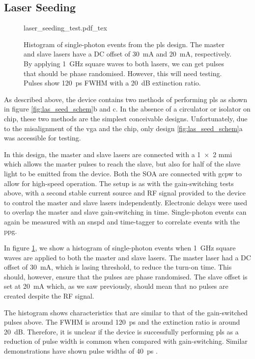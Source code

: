 \subsection{Laser Seeding}

\begin{figure}[tp]
	\centering	
	\def\svgwidth{0.9\textwidth} 
	{laser_seeding_test.pdf_tex}
	\caption[Integrated laser seeding test histogram]{Histogram of single-photon events from the \acs{pls} design. The master and slave lasers have a DC offset of \SI{30}{\mA} and \SI{20}{\mA}, respectively. By applying \SI{1}{GHz} square waves to both lasers, we can get pulses that should be phase randomised. However,  this will need testing. Pulses show \SI{120}{ps} \acs{FWHM} with a \SI{20}{dB} extinction ratio.}
	\label{fig:las_seed_test}
\end{figure}

As described above, the device contains two methods of performing \ac{pls} as shown in figure \ref{fig:las_seed_schem}b and c. In the absence of a circulator or isolator on chip, these two methods are the simplest conceivable designs. Unfortunately, due to the misalignment of the \ac{vga} and the chip, only design \ref{fig:las_seed_schem}a was accessible for testing. 

In this design, the master and slave lasers are connected with a \num{1x2} \ac{mmi} which allows the master pulses to reach the slave, but also for half of the slave light to be emitted from the device. Both the \ac{SOA} are connected with \ac{gcpw} to allow for high-speed operation. The setup is as with the gain-switching tests above, with a second stable current source and RF signal provided to the device to control the master and slave lasers independently. Electronic delays were used to overlap the master and slave gain-switching in time. Single-photon events can again be measured with an \ac{snspd} and time-tagger to correlate events with the \ac{ppg}.

In figure \ref{fig:las_seed_test}, we show a histogram of single-photon events when \SI{1}{GHz} square waves are applied to both the master and slave lasers. The master laser had a DC offset of \SI{30}{\mA}, which is lasing threshold, to reduce the turn-on time. This should, however, ensure that the pulses are phase randomised. The slave offset is set at \SI{20}{\mA} which, as we saw previously, should mean that no pulses are created despite the RF signal. 

The histogram shows characteristics that are similar to that of the gain-switched pulses above. The \ac{FWHM} is around \SI{120}{ps} and the extinction ratio is around \SI{20}{dB}. Therefore, it is unclear if the device is successfully performing \ac{pls} as a reduction of pulse width is common when compared with gain-switching. Similar demonstrations have shown pulse widths of \SI{40}{ps} \cite{paraiso2019, Comandar2016PLS}.

